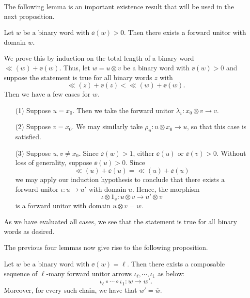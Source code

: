 The following lemma is an important existence result that will be used in the 
next proposition.

\begin{lemma}\label{lemma:existence_w_to_clean_w}
    Let $w$ be a binary word with $\ee(w) > 0$.
    Then there exists a forward unitor with domain $w$.
\end{lemma}

\begin{prf}
    We prove this by induction on the total length of a binary word 
    $\ll(w) + \ee(w)$. 
    Thus, let $w = u \otimes v$ be a binary word with $\ee(w) > 0$ 
    and suppose the statement is true 
    for all binary words $z$ with
    \[
        \ll(z) + \ee(z) < \ll(w) + \ee(w).
    \]
    Then we have a few cases for $w$. 
    \begin{itemize}
        \item[(1)] Suppose $u = x_0$. Then we take the forward unitor 
        $\lambda_v: x_0 \otimes v \to v$.

        \item[(2)] Suppose $v = x_0$. We may similarly take $\rho_u: u \otimes x_0 \to u$, 
        so that this case is satisfied. 
        
        \item[(3)] Suppose $u, v \ne x_0$. Since $\ee(w) > 1$, 
        either $\ee(u)$ or $\ee(v) > 0$. Without loss of generality, suppose 
        $\ee(u) > 0$. Since 
        \[
            \ll(u) + \ee(u) = \ll(u) + \ee(u)
        \]
        we may apply our induction hypothesis to conclude that there exists 
        a forward unitor $\iota: u \to u'$ with domain $u$. 
        Hence, the morphism 
        \[
            \iota \otimes 1_v : u \otimes v \to u' \otimes v
        \]
        is a forward unitor with domain $u \otimes v = w$. 
    \end{itemize}
    As we have evaluated all cases, we see that the statement is true for all
    binary words as desired. 
\end{prf}

The previous four lemmas now give rise to the following proposition. 
\begin{proposition}\label{proposition:exists_w_to_clean_w}
    Let $w$ be a binary word with $\ee(w) = \ell$. Then there exists a 
    composable sequence of
    ${\ell}$-many forward unitor arrows $\iota_{\ell}, \cdots, \iota_1$ as below:
    \[
        \iota_{\ell} \circ \cdots \circ \iota_1: w \to w'.
    \]
    Moreover, for every such chain, we have that $w' = \overline{w}$. 
\end{proposition}

